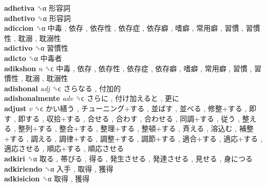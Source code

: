 \textbf{adhetiva} ␝α   形容詞   \\
\textbf{adhetivo} ␝α   形容詞   \\
\textbf{adiccion} ␝α   中毒 ,  依存 ,  依存性 ,  依存症 ,  依存癖 ,  嗜癖 ,  常用癖 ,  習慣 ,  習慣性 ,  耽溺 ,  耽溺性   \\
\textbf{adictivo} ␝α   習慣性   \\
\textbf{adicto} ␝α   中毒者   \\
\textbf{adikshon} \emph{n}  ␝ϲ   中毒 ,  依存 ,  依存性 ,  依存症 ,  依存癖 ,  嗜癖 ,  常用癖 ,  習慣 ,  習慣性 ,  耽溺 ,  耽溺性   \\
\textbf{adishonal} \emph{adj}  ␝ϲ   さらなる ,  付加的   \\
\textbf{adishonalmente} \emph{adv}  ␝ϲ   さらに ,  付け加えると ,  更に   \\
\textbf{adjust} \emph{v}  ␝ϲ   かい繕う ,  チューニング+する ,  並ばす ,  並べる ,  修整+する ,  即す ,  即する ,  収拾+する ,  合せる ,  合わす ,  合わせる ,  同調+する ,  従う ,  整える ,  整列+する ,  整合+する ,  整理+する ,  整頓+する ,  斉える ,  溶込む ,  補整+する ,  調える ,  調律+する ,  調整+する ,  調節+する ,  適合+する ,  適応+する ,  適応させる ,  順応+する ,  順応させる   \\
\textbf{adkiri} ␝α   取る ,  帯びる ,  得る ,  発生させる ,  発達させる ,  見せる ,  身につる   \\
\textbf{adkiriendo} ␝α   入手 ,  取得 ,  獲得   \\
\textbf{adkisicion} ␝α   取得 ,  獲得   \\

